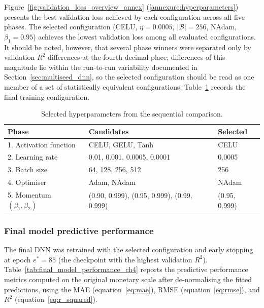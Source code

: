 Figure~\ref{fig:validation_loss_overview_annex}
(\ref{annexure:hyperparameters}) presents the best validation
loss achieved by each configuration across all five phases.
The selected configuration (CELU, $\eta = 0.0005$,
$|\mathcal{B}| = 256$, NAdam, $\beta_1 = 0.95$) achieves the lowest
validation loss among all evaluated configurations.
It should be noted, however, that several phase winners were separated
only by validation-$R^2$ differences at the fourth decimal place;
differences of this magnitude lie within the run-to-run variability
documented in Section~\ref{sec:multiseed_dnn}, so the selected
configuration should be read as one member of a set of statistically
equivalent configurations.
Table~\ref{tab:final_hyperparameters_ch4} records the final training
configuration.

\begin{table}[H]
\centering
\small
\renewcommand{\arraystretch}{1.15}
\begin{tabular}{p{}p{}p{}}
\toprule
\textbf{Phase} & \textbf{Candidates} & \textbf{Selected} \\
\midrule
1. Activation function & CELU, GELU, Tanh & CELU \\
2. Learning rate & 0.01, 0.001, 0.0005, 0.0001 & 0.0005 \\
3. Batch size & 64, 128, 256, 512 & 256 \\
4. Optimiser & Adam, NAdam & NAdam \\
5. Momentum $(\beta_1, \beta_2)$ & (0.90, 0.999), (0.95, 0.999), (0.99, 0.999) & (0.95, 0.999) \\
\bottomrule
\end{tabular}
\caption{Selected hyperparameters from the sequential comparison.}
\label{tab:final_hyperparameters_ch4}
\end{table}

\subsubsection{Final model predictive performance}

The final DNN was retrained with the selected configuration and
early stopping at epoch $e^{*} = 85$ (the checkpoint with the highest
validation $R^2$).
Table~\ref{tab:final_model_performance_ch4} reports the predictive
performance metrics computed on the original monetary scale after
de-normalising the fitted predictions, using the MAE
(equation~\eqref{eq:mae}), RMSE (equation~\eqref{eq:rmse}), and
$R^2$ (equation~\eqref{eq:r_squared}).

